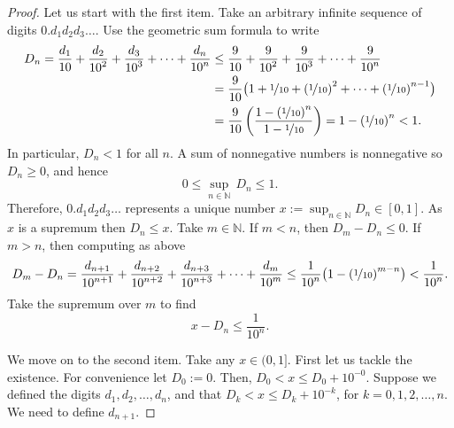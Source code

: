 \documentclass[12pt]{book}
\newcommand{\N}{{\mathbb{N}}}
\theoremstyle{plain}
\theoremstyle{remark}
\theoremstyle{definition}
\theoremstyle{exercise}
\theoremstyle{example}
\begin{document}
\begin{proof}
Let us start with the first item.  Take an arbitrary infinite sequence of
digits $0.d_1d_2d_3\ldots$.  Use the geometric sum formula to write
\begin{equation*}
\begin{split}
D_n =
\frac{d_1}{10} + 
\frac{d_2}{{10}^2} + 
\frac{d_3}{{10}^3} + 
\cdots +
\frac{d_n}{{10}^n} 
& \leq
\frac{9}{10} + 
\frac{9}{{10}^2} + 
\frac{9}{{10}^3} + 
\cdots +
\frac{9}{{10}^n} 
\\
& =
\frac{9}{10}
\bigl( 1 + \nicefrac{1}{10} + 
{(\nicefrac{1}{10})}^2 + \cdots + 
{(\nicefrac{1}{10})}^{n-1} \bigr)
\\
& =
\frac{9}{10}
\left(
\frac{1-{(\nicefrac{1}{10})}^{n}}{1-\nicefrac{1}{10}}
\right)
= 1-{(\nicefrac{1}{10})}^{n}
< 1 .
\end{split}
\end{equation*}
In particular, $D_n < 1$ for all $n$.  A sum of nonnegative numbers is
nonnegative so $D_n \geq 0$, and hence
\begin{equation*}
0 \leq \sup_{n\in \N} \, D_n \leq 1 .
\end{equation*}
Therefore, $0.d_1d_2d_3\ldots$ represents a unique number $x := \sup_{n\in
\N} D_n \in [0,1]$.
As $x$ is a supremum then $D_n \leq x$.
Take $m \in \N$.  If $m < n$, then $D_m - D_n \leq 0$.  If $m > n$, then
computing as above
\begin{equation*}
D_m - D_n
=
\frac{d_{n+1}}{{10}^{n+1}} + 
\frac{d_{n+2}}{{10}^{n+2}} + 
\frac{d_{n+3}}{{10}^{n+3}} + 
\cdots +
\frac{d_{m}}{{10}^m} 
\leq
\frac{1}{{10}^{n}}
\bigl(
1-{(\nicefrac{1}{10})}^{m-n}
\bigr)
<
\frac{1}{{10}^{n}} .
\end{equation*}
Take the supremum over $m$ to find
\begin{equation*}
x - D_n
\leq
\frac{1}{{10}^{n}} .
\end{equation*}

We move on to the
second item.  Take any $x \in (0,1]$.
First let us tackle the existence.
For convenience let $D_0 := 0$.
Then,
$D_0 < x \leq D_0 + {10}^{-0}$.
Suppose we defined the digits $d_1,d_2,\ldots,d_n$,
and that 
$D_k < x \leq D_k + {10}^{-k}$, for $k=0,1,2,\ldots,n$.  We need to define $d_{n+1}$.


\end{proof}
\end{document}
